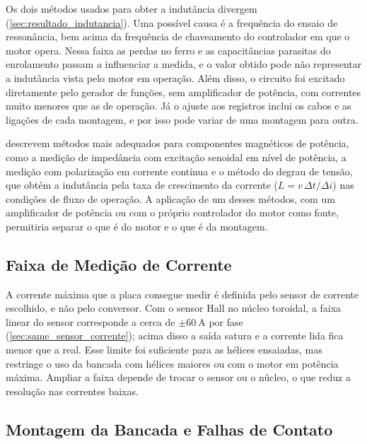 Os dois métodos usados para obter a indutância divergem
(\autoref{sec:resultado_indutancia}). Uma possível causa é a frequência do
ensaio de ressonância, bem acima da frequência de chaveamento do controlador
em que o motor opera. Nessa faixa as perdas no ferro e as capacitâncias
parasitas do enrolamento passam a influenciar a medida, e o valor obtido pode
não representar a indutância vista pelo motor em operação. Além disso, o
circuito foi excitado diretamente pelo gerador de funções, sem amplificador de
potência, com correntes muito menores que as de operação. Já o ajuste aos
registros inclui os cabos e as ligações de cada montagem, e por isso pode variar de uma
montagem para outra.

 descrevem métodos mais adequados para
componentes magnéticos de potência, como a medição de impedância com
excitação senoidal em nível de potência, a medição com polarização em
corrente contínua e o método do degrau de tensão, que obtém a indutância pela
taxa de crescimento da corrente ($L = v\,\Delta t/\Delta i$) nas condições de
fluxo de operação. A aplicação de um desses métodos, com um amplificador de
potência ou com o próprio controlador do motor como fonte, permitiria
separar o que é do motor e o que é da montagem.

\subsection{Faixa de Medição de Corrente}
\label{sec:discussao_corrente}

A corrente máxima que a placa consegue medir é definida pelo sensor de
corrente escolhido, e não pelo conversor. Com o sensor Hall no núcleo
toroidal, a faixa linear do sensor corresponde a cerca de
$\pm\SI{60}{\ampere}$ por fase (\autoref{sec:same_sensor_corrente}); acima
disso a saída satura e a corrente lida fica menor que a real. Esse limite foi
suficiente para as hélices ensaiadas, mas restringe o uso da bancada com
hélices maiores ou com o motor em potência máxima. Ampliar a faixa depende de
trocar o sensor ou o núcleo, o que reduz a resolução nas correntes baixas.

\subsection{Montagem da Bancada e Falhas de Contato}
\label{sec:discussao_montagem}

